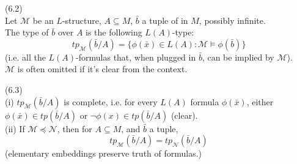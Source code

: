 \documentclass[a4paper]{article}
\begin{document}
\begin{defi} (6.2)\\
    Let $\mathcal{M}$ be an $L$-structure, $A \subseteq M$, $\bar{b}$ a tuple of in $M$, possibly infinite.\\
    The type of $\bar{b}$ over $A$ is the following $L(A)$-type:
    $$tp_\mathcal{M}(\bar{b}/A) = \{\phi(\bar{x}) \in L(A): \mathcal{M} \vDash \phi(\bar{b})\}$$
    (i.e. all the $L(A)$-formulas that, when plugged in $\bar{b}$, can be implied by $\mathcal{M}$).\\
    $\mathcal{M}$ is often omitted if it's clear from the context.
\end{defi}

\begin{rem} (6.3)\\
    (i) $tp_{\mathcal{M}} (\bar{b}/A)$ is complete, i.e. for every $L(A)$ formula $\phi(\bar{x})$, either $\phi(\bar{x}) \in tp(\bar{b}/A)$ or $\neg\phi(x) \in tp(\bar{b}/A)$ (clear).\\
    (ii) If $\mathcal{M} \preccurlyeq\mathcal{N}$, then for $A \subseteq M$, and $\bar{b}$ a tuple,
    $$tp_\mathcal{M}(\bar{b}/A) = tp_\mathcal{N}(\bar{b}/A)$$
    (elementary embeddings preserve truth of formulas.)
\end{rem}
\end{document}

